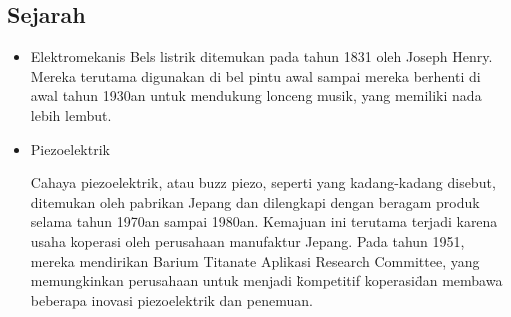 \subsection{Sejarah}
\begin{itemize}
\item Elektromekanis
Bels listrik ditemukan pada tahun 1831 oleh Joseph Henry. Mereka terutama digunakan di bel pintu awal sampai mereka berhenti di awal tahun 1930an untuk mendukung
lonceng musik, yang memiliki nada lebih lembut.
\item Piezoelektrik

	
Cahaya piezoelektrik, atau buzz piezo, seperti yang kadang-kadang disebut, ditemukan oleh pabrikan Jepang dan dilengkapi dengan beragam produk selama tahun 1970an 
sampai 1980an. Kemajuan ini terutama terjadi karena usaha koperasi oleh perusahaan manufaktur Jepang. Pada tahun 1951, mereka mendirikan Barium Titanate Aplikasi 
Research Committee, yang memungkinkan perusahaan untuk menjadi \"kompetitif koperasi\" dan membawa beberapa inovasi piezoelektrik dan penemuan.
\end{itemize}

